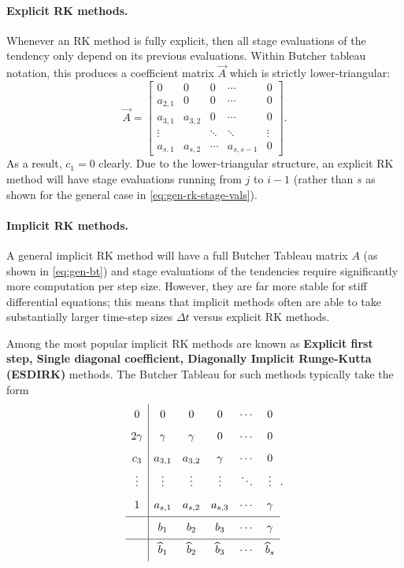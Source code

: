 \documentclass{article}
\begin{document}
\paragraph{Explicit RK methods.} Whenever an RK method is fully explicit,
then all stage evaluations of the tendency
only depend on its previous evaluations. Within Butcher tableau notation, this
produces a coefficient matrix $\vec{A}$ which is strictly lower-triangular:
\begin{equation}
	\vec{A} = \begin{bmatrix}
	0        & 0        & 0      & \cdots     & 0 \\
	a_{2, 1} & 0        & 0      & \cdots     & 0 \\
	a_{3, 1} & a_{3, 2} & 0      & \cdots     & 0 \\
	\vdots   &          & \ddots & \ddots     & \vdots \\
	a_{s, 1} & a_{s, 2} & \cdots & a_{s, s-1} & 0
	\end{bmatrix}.
\end{equation}
As a result, $c_1 = 0$ clearly. Due to the lower-triangular structure, an explicit RK
method will have stage evaluations running from $j$ to $i-1$ (rather than $s$ as shown
for the general case in \eqref{eq:gen-rk-stage-vals}).

\paragraph{Implicit RK methods.} A general implicit RK method will have a
full Butcher Tableau matrix $A$ (as shown in \eqref{eq:gen-bt})
and stage evaluations of the tendencies require significantly more
computation per step size. However, they are far more stable for stiff differential equations;
this means that implicit methods often are able to take substantially larger
time-step sizes $\Delta t$ versus explicit RK methods.

Among the most popular implicit RK methods are known as \textbf{Explicit first step, Single
diagonal coefficient, Diagonally Implicit Runge-Kutta (ESDIRK)} methods.
The Butcher Tableau for such methods typically take the form
\begin{equation}\label{eq:esdirk-bt}
\begin{array}{c|c c c c c}
\ST 0 & 0 & 0 & 0 & \cdots & 0 \\
\ST 2\gamma & \gamma & \gamma & 0 & \cdots & 0\\
\ST c_3 & a_{3, 1} & a_{3, 2} & \gamma & \cdots & 0 \\
\ST \vdots & \vdots & \vdots & \vdots & \ddots & \vdots \\
\ST 1 & a_{s,1} & a_{s,2} & a_{s,3} & \cdots & \gamma \\
\hline
\ST  & b_1 & b_2 & b_3 & \cdots & \gamma \\
\hline
\ST  & \widehat{b}_1 & \widehat{b}_2 & \widehat{b}_3 & \cdots & \widehat{b}_s
\end{array}.
\end{equation}
\end{document}
